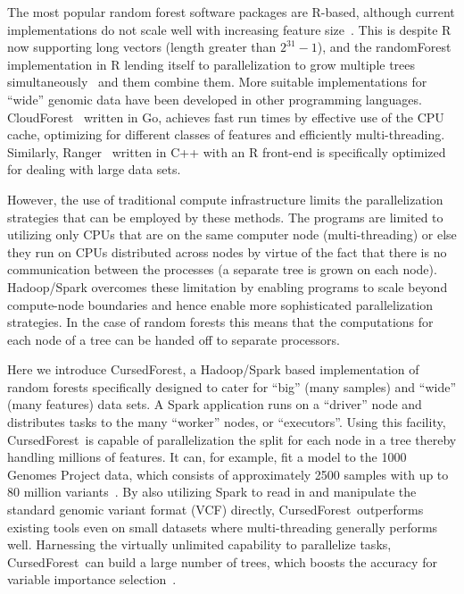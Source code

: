 \documentclass[10pt,letterpaper]{article}
\newcommand{\cursedforest}{{\sc CursedForest}}
\begin{document}
The most popular random forest software packages are R-based, although current implementations do not scale well with
increasing feature size~\cite{Wright.and.Ziegle.2016}.  This is despite R now supporting long vectors (length greater
than $2^{31}-1$), and the {\sc randomForest} implementation in R lending itself to parallelization to grow multiple trees
simultaneously~\cite{Liaw.and.Weiner.2002} and them combine them.  More suitable implementations for ``wide'' genomic data have been
developed in other programming languages. {\sc CloudForest}~\cite{Bressler2015} written in Go, achieves fast run
times by effective use of the CPU cache, optimizing for different classes of features and efficiently multi-threading.
Similarly, {\sc Ranger}~\cite{Wright.and.Ziegle.2016} written in C++ with an R front-end is specifically optimized for
dealing with large data sets.

However, the use of traditional compute infrastructure limits the parallelization strategies that can be employed by
these methods.  The programs are limited to utilizing only CPUs that are on the same computer node (multi-threading) or
else they run on CPUs distributed across nodes by virtue of the fact that there is no communication between the
processes (a separate tree is grown on each node).  Hadoop/Spark overcomes these limitation by enabling programs to
scale beyond compute-node boundaries and hence enable more sophisticated parallelization strategies.  In the case of
random forests this means that the computations for each node of a tree can be handed off to separate processors.
  
Here we introduce \cursedforest, a Hadoop/Spark based implementation of random forests specifically designed to cater
for ``big'' (many samples) and ``wide'' (many features) data sets. A Spark application runs on a ``driver'' node and
distributes tasks to the many ``worker'' nodes, or ``executors''. Using this facility, \cursedforest\ is capable of
parallelization the split for each node in a tree thereby handling millions of features. It can, for example, fit a
model to the 1000 Genomes
Project data, which consists of approximately 2500 samples with up to 80 million variants~\cite{1KG2012}.  By also
utilizing Spark to read in and manipulate the standard genomic variant format (VCF) directly, \cursedforest\ outperforms
existing tools even on small datasets where multi-threading generally performs well. Harnessing the virtually unlimited
capability to parallelize tasks, \cursedforest\ can build a large number of trees, which boosts the accuracy for
variable importance selection~\cite{Szymczak2016}.
\end{document}
